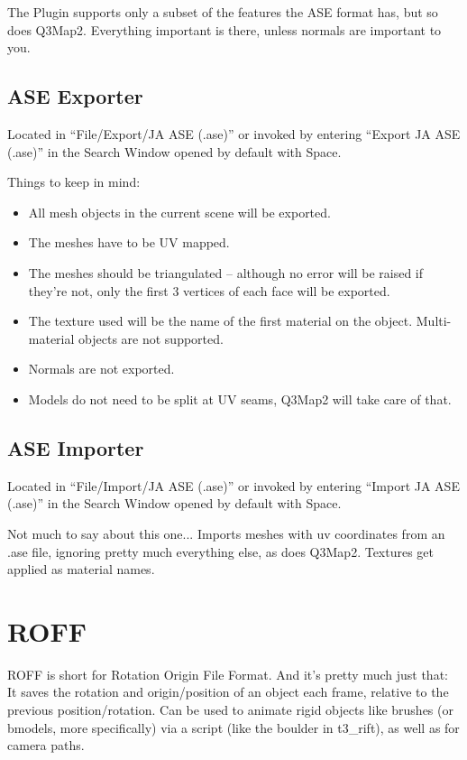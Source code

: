 \documentclass[a4paper,10pt]{article}
\begin{document}
 The Plugin supports only a subset of the features the ASE format has, but so does Q3Map2. Everything important
 is there, unless normals are important to you.
 
 \subsection{ASE Exporter}
 
 Located in ``File/Export/JA ASE (.ase)'' or invoked by entering ``Export JA ASE (.ase)'' in the Search Window
 opened by default with Space.
 
 Things to keep in mind:
 \begin{itemize}
  \item All mesh objects in the current scene will be exported.
  \item The meshes have to be UV mapped.
  \item The meshes should be triangulated -- although no error will be raised if they're not, only the first
  3 vertices of each face will be exported.
  \item The texture used will be the name of the first material on the object. Multi-material objects are not
  supported.
  \item Normals are not exported.
  \item Models do not need to be split at UV seams, Q3Map2 will take care of that.
 \end{itemize}
 
 \subsection{ASE Importer}
 
 Located in ``File/Import/JA ASE (.ase)'' or invoked by entering ``Import JA ASE (.ase)'' in the Search Window
 opened by default with Space.
 
 Not much to say about this one... Imports meshes with uv coordinates from an .ase file, ignoring pretty much
 everything else, as does Q3Map2. Textures get applied as material names.
 
 \section{ROFF}
 
 ROFF is short for Rotation Origin File Format. And it's pretty much just that: It saves the rotation and
 origin/position of an object each frame, relative to the previous position/rotation. Can be used to animate
 rigid objects like brushes (or bmodels, more specifically) via a script (like the boulder in t3\_rift), as
 well as for camera paths.
 
\end{document}

